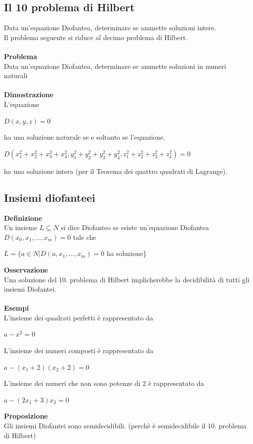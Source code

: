 \subsection{Il 10 problema di Hilbert}
Data un’equazione Diofantea, determinare se ammette soluzioni intere.\\
Il problema seguente si riduce al decimo problema di Hilbert.\\\\
\textbf{Problema}\\
Data un’equazione Diofantea, determinare se ammette soluzioni in numeri naturali\\\\
\textbf{Dimostrazione}\\
L’equazione
\begin{center}
    $D(x,y,z) = 0$
\end{center}
ha una soluzione naturale se e soltanto se l’equazione.\\
\begin{center}
    $D(x^2_1 + x^2_2 + x^2_3 + x^2_4, y^2_1 + y^2_2 + y^2_3 + y^2_4, z^2_1 + z^2_2 + z^2_3 + z^2_4) = 0$
\end{center}
ha una soluzione intera (per il Teorema dei quattro quadrati di Lagrange).
\subsection{Insiemi diofanteei}
\textbf{Definizione}\\
Un insieme $L \subseteq N$ si dice Diofanteo se esiste un’equazione Diofantea $D(x_0, x_1, . . . , x_m) = 0$ tale che
\begin{center}
    $L = \{a \in N | D(a, x_1, . . . , x_m ) = 0$ ha soluzione\}
\end{center}
\textbf{Osservazione}\\
Una soluzione del 10. problema di Hilbert implicherebbe la decidibilità di tutti gli insiemi Diofantei.\\\\
\textbf{Esempi}\\
L’insieme dei quadrati perfetti è rappresentato da
\begin{center}
    $a - x^2 = 0$
\end{center}
L’insieme dei numeri composti è rappresentato da
\begin{center}
    $a - (x_1 + 2)(x_2 + 2) = 0$
\end{center}
L’insieme dei numeri che non sono potenze di 2 è rappresentato da
\begin{center}
    $a - (2x_1 +3)x_2 = 0$
\end{center}
\textbf{Proposizione}\\
Gli insiemi Diofantei sono semidecidibili. (perchè è semidecidibile il 10. problema di Hilbert)
